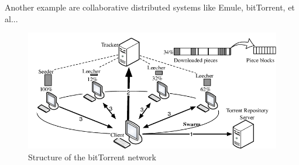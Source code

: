 Another example are collaborative distributed systems like Emule, bitTorrent, et al...
\begin{figure}[htb]
    \centering
    \includegraphics[scale=0.45]{./Images/bittorrent.png}
    \caption{Structure of the bitTorrent network}
\end{figure}
